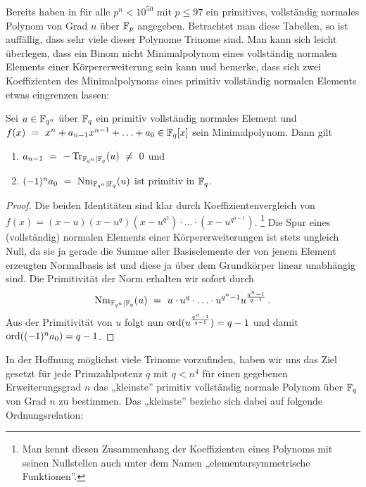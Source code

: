 Bereits \citeauthor{morgan1996} haben in \autocite{morgan1996} für alle 
$p^n < 10^{50}$ mit $p\leq 97$ ein primitives, vollständig normales Polynom 
von Grad $n$ über $\mathbb{F}_p$ angegeben. Betrachtet man diese Tabellen, so ist
auffällig, dass sehr viele dieser Polynome Trinome sind. Man kann sich leicht
überlegen, dass ein Binom nicht Minimalpolynom eines vollständig normalen
Elements einer Körpererweiterung sein kann und bemerke, dass sich 
zwei Koeffizienten des Minimalpolynoms eines primitiv vollständig normalen
Elements etwas eingrenzen lassen:

\begin{lemma}
  Sei $u \in \mathbb{F}_{q^n}$ über $\mathbb{F}_q$ ein primitiv vollständig normales Element
  und $f(x) \ =\  x^n + a_{n-1}x^{n-1}+\ldots+a_0 \in \mathbb{F}_q[x]$ 
  sein Minimalpolynom. Dann gilt
  \begin{enumerate}
    \item $a_{n-1} \ =\  -\operatorname{Tr}_{\mathbb{F}_{q^n}\mid \mathbb{F}_q}(u) \ \neq\  0$ und 
    \item $(-1)^na_0 \ =\  \operatorname{Nm}_{\mathbb{F}_{q^n}\mid \mathbb{F}_q}(u)$ ist primitiv in $\mathbb{F}_q$.
  \end{enumerate}
\end{lemma}
\begin{proof}
  Die beiden Identitäten sind klar durch Koeffizientenvergleich von
  $f(x) = (x-u)(x-u^q)(x-u^{q^2})\cdot\ldots\cdot(x-u^{q^{n-1}})$.%
  \footnote{Man kennt diesen Zusammenhang der 
    Koeffizienten eines Polynoms mit seinen Nullstellen auch unter dem Namen
    „elementarsymmetrische Funktionen”.}
  Die Spur eines (vollständig) normalen Elements einer Körpererweiterungen ist
  stets ungleich Null, da sie ja gerade die Summe aller Basiselemente der 
  von jenem Element erzeugten Normalbasis ist und diese ja über dem Grundkörper
  linear unabhängig sind. 
  Die Primitivität der Norm erhalten wir sofort durch
  \[ \operatorname{Nm}_{\mathbb{F}_{q^n}\mid \mathbb{F}_q}(u) \ =\  u\cdot u^q\cdot \ldots\cdot u^{q^n-1}
    u^{\frac{q^n-1}{q-1}}\,.\]
  Aus der Primitivität von $u$ folgt nun $\operatorname{ord}(u^{\frac{q^n-1}{q-1}}) = q-1$
  und damit $\operatorname{ord}((-1)^na_0) = q-1$.
\end{proof}

In der Hoffnung möglichst viele Trinome vorzufinden, haben wir uns das Ziel
gesetzt für jede Primzahlpotenz $q$ mit $q < n^4$ für einen gegebenen
Erweiterungsgrad $n$ das „kleinste” primitiv vollständig normale Polynom
über $\mathbb{F}_q$ von Grad $n$ zu bestimmen. Das „kleinste” beziehe sich dabei auf
folgende Ordnungsrelation:

